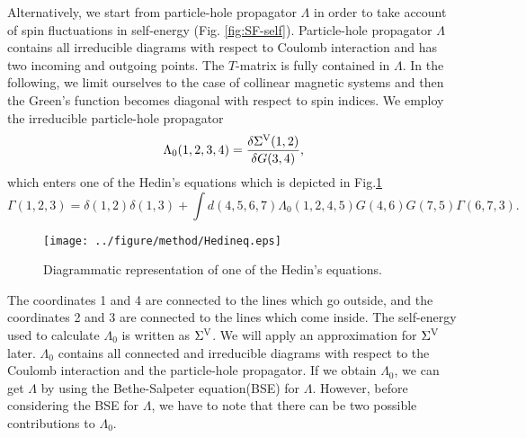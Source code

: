 Alternatively, we start from particle-hole propagator $\Lambda$ in order to 
take account of spin fluctuations in self-energy (Fig. \ref{fig:SF-self}).
Particle-hole propagator $\Lambda$ contains all irreducible 
diagrams with respect to Coulomb interaction and has two 
incoming and outgoing points. The $T$-matrix is fully contained in $\Lambda$.
In the following, we limit ourselves to the case of collinear magnetic systems and 
then the Green's function becomes diagonal with respect to spin indices.
We employ the irreducible particle-hole propagator\cite{Arya2008}
%
\begin{equation}
	\Lambda_0(1,2,3,4) = \frac{\delta\Sigma^{\rm V}(1,2)}{\delta G(3,4)},
	\label{eq:lambda0}
\end{equation}
%
which enters one of the Hedin's equations\cite{Sole1994} which is depicted in Fig.\ref{fig:Hedineq}
%
\begin{equation}
	\Gamma(1,2,3) = \delta(1,2)\delta(1,3) + 
	\int d(4,5,6,7)\Lambda_0(1,2,4,5)
	G(4,6)G(7,5)\Gamma(6,7,3).
	\label{eq:Hedineq}
\end{equation}
%
\begin{figure} %
	\centering
	\texttt{[image: ../figure/method/Hedineq.eps]}
	\caption{Diagrammatic representation of one of the Hedin's equations.}
	\label{fig:Hedineq}
\end{figure}
The coordinates 1 and 4 are connected to the lines which go outside,
and the coordinates 2 and 3 are connected to the lines which come inside.
The self-energy used to calculate $\Lambda_0$ is written as $\Sigma^{\rm V}$.
We will apply an approximation for $\Sigma^{\rm V}$ later.
$\Lambda_0$ contains all connected and irreducible diagrams with
respect to the Coulomb interaction and the particle-hole propagator.
If we obtain $\Lambda_0$, we can get $\Lambda$ by using the
Bethe-Salpeter equation(BSE)\cite{BSE1951} for $\Lambda$.
However, before considering the BSE for $\Lambda$, we have to note that
there can be two possible contributions to $\Lambda_0$.

